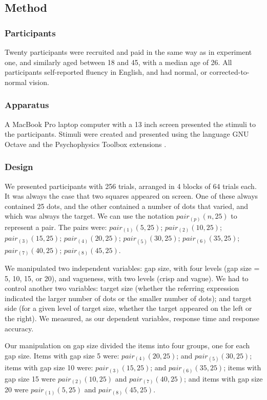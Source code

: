 \documentclass[doc,floatmark]{apa}
\begin{document}
\subsection{Method}

\subsubsection{Participants}

Twenty participants were recruited and paid in the same way as in experiment one, and similarly aged between 18 and 45, with a median age of 26. All participants self-reported fluency in English, and had normal, or corrected-to-normal vision.

\subsubsection{Apparatus}

A MacBook Pro laptop computer with a 13 inch screen presented the stimuli to the participants. Stimuli were created and presented using the language GNU Octave \cite{eaton:2002} and the Psychophysics Toolbox extensions \cite{ptbx1, ptbx2}.

\subsubsection{Design}

We presented participants with 256 trials, arranged in 4 blocks of 64 trials each. It was always the case that two squares appeared on screen. One of these always contained 25 dots, and the other contained a number of dots that varied, and which was always the target. We can use the notation $pair_{(p)}(n,25)$ to represent a pair. The pairs were: $pair_{(1)}(5,25)$; $pair_{(2)}(10,25)$; $pair_{(3)}(15,25)$; $pair_{(4)}(20,25)$; $pair_{(5)}(30,25)$; $pair_{(6)}(35,25)$; $pair_{(7)}(40,25)$; $pair_{(8)}(45,25)$.

We manipulated two independent variables: gap size, with four levels (gap size = 5, 10, 15, or 20), and vagueness, with two levels (crisp and vague). We had to control another two variables: target size (whether the referring expression indicated the larger number of dots or the smaller number of dots); and target side (for a given level of target size, whether the target appeared on the left or the right). We measured, as our dependent variables, response time and response accuracy.

Our manipulation on gap size divided the items into four groups, one for each gap size. Items with gap size 5 were: $pair_{(4)}(20,25)$; and $pair_{(5)}(30,25)$; items with gap size 10 were: $pair_{(3)}(15,25)$; and $pair_{(6)}(35,25)$; items with gap size 15 were $pair_{(2)}(10,25)$ and $pair_{(7)}(40,25)$; and items with gap size 20 were $pair_{(1)}(5,25)$ and $pair_{(8)}(45,25)$.
\end{document}
